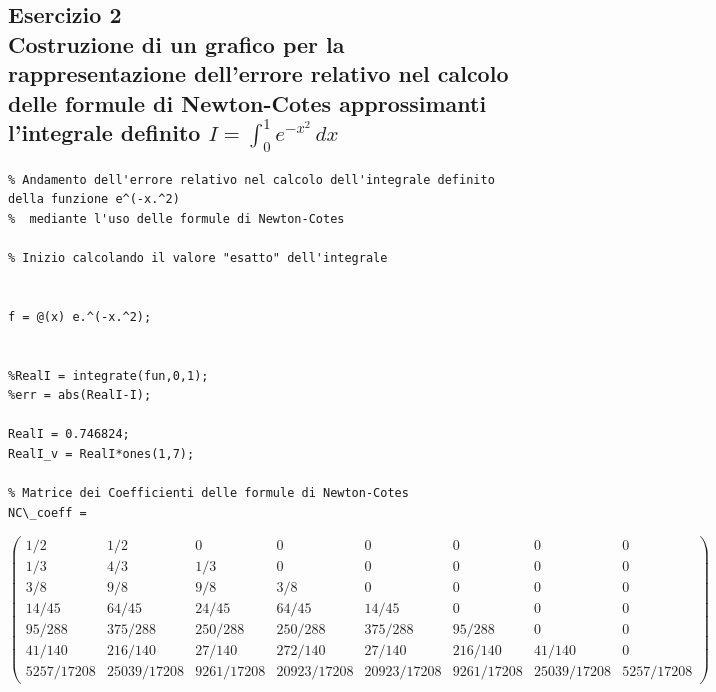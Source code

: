 \documentclass{article}
\begin{document}
\subsection{Esercizio 2 \\ Costruzione di un grafico per la rappresentazione dell'errore relativo nel calcolo delle formule di Newton-Cotes approssimanti l'integrale definito $I=\int_{0}^{1} e^{-x^{2}}\,dx$}
\begin{lstlisting}
% Andamento dell'errore relativo nel calcolo dell'integrale definito della funzione e^(-x.^2)
%  mediante l'uso delle formule di Newton-Cotes

% Inizio calcolando il valore "esatto" dell'integrale


f = @(x) e.^(-x.^2);


%RealI = integrate(fun,0,1);
%err = abs(RealI-I);

RealI = 0.746824;
RealI_v = RealI*ones(1,7);

% Matrice dei Coefficienti delle formule di Newton-Cotes
NC\_coeff =
\end{lstlisting}


\[
\begin{pmatrix}


                  
      	1/2        &1/2         &0          &0           &0           &0          &0           &0  \\
        1/3        &4/3         &1/3        &0           &0           &0          &0           &0  \\
        3/8        &9/8         &9/8        &3/8         &0           &0          &0           &0  \\
        14/45      &64/45       &24/45      &64/45       &14/45       &0          &0           &0  \\
        95/288     &375/288     &250/288    &250/288     &375/288     &95/288     &0           &0  \\
        41/140     &216/140     &27/140     &272/140     &27/140      &216/140    &41/140      &0  \\
        5257/17208 &25039/17208 &9261/17208 &20923/17208 &20923/17208 &9261/17208 &25039/17208 &5257/17208 

\end{pmatrix}                
\]
\end{document}
